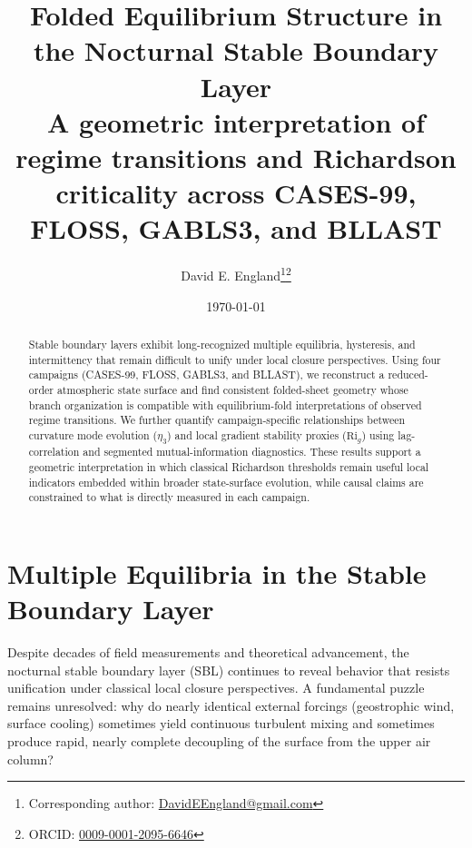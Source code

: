 \documentclass[12pt,a4paper]{article}
\title{Folded Equilibrium Structure in the Nocturnal Stable Boundary Layer\\\large A geometric interpretation of regime transitions and Richardson criticality across CASES-99, FLOSS, GABLS3, and BLLAST}
\author{David E. England\thanks{Corresponding author: \href{mailto:DavidEEngland@gmail.com}{DavidEEngland@gmail.com}}\thanks{ORCID: \href{https://orcid.org/0009-0001-2095-6646}{0009-0001-2095-6646}}}
\date{\today}
\begin{document}
\maketitle

\begin{abstract}
Stable boundary layers exhibit long-recognized multiple equilibria, hysteresis, and intermittency that remain difficult to unify under local closure perspectives. Using four campaigns (CASES-99, FLOSS, GABLS3, and BLLAST), we reconstruct a reduced-order atmospheric state surface and find consistent folded-sheet geometry whose branch organization is compatible with equilibrium-fold interpretations of observed regime transitions. We further quantify campaign-specific relationships between curvature mode evolution ($\eta_3$) and local gradient stability proxies ($\mathrm{Ri}_g$) using lag-correlation and segmented mutual-information diagnostics. These results support a geometric interpretation in which classical Richardson thresholds remain useful local indicators embedded within broader state-surface evolution, while causal claims are constrained to what is directly measured in each campaign.
\end{abstract}

\section{Multiple Equilibria in the Stable Boundary Layer}

Despite decades of field measurements and theoretical advancement, the nocturnal stable boundary layer (SBL) continues to reveal behavior that resists unification under classical local closure perspectives. A fundamental puzzle remains unresolved: why do nearly identical external forcings (geostrophic wind, surface cooling) sometimes yield continuous turbulent mixing and sometimes produce rapid, nearly complete decoupling of the surface from the upper air column?
\end{document}
